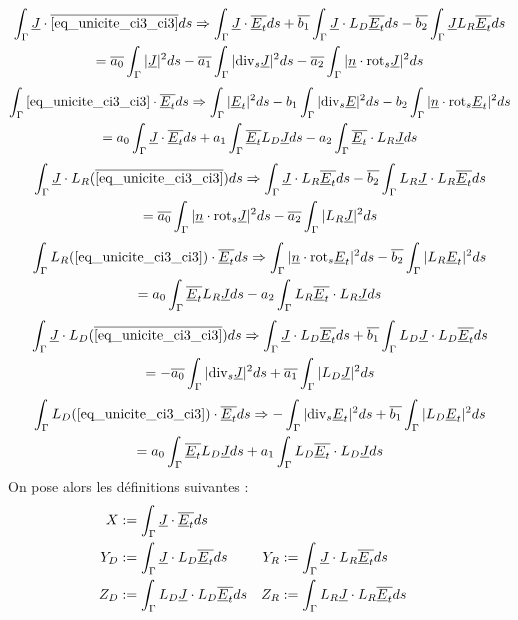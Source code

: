 \begin{multline}
\label{eq:unicite:ci3:csu3-1}
\int_\Gamma \underline{J}\cdot{\overline{\eqref{eq_unicite_ci3_ci3}}}ds \Rightarrow
\int_\Gamma \underline{J} \cdot {\overline{\underline{E}_t}} ds  + {\overline{b_1}} \int_\Gamma \underline{J}\cdot L_D{\overline{\underline{E}_t}} ds - {\overline{b_2}} \int_\Gamma \underline{J} L_R{\overline{\underline{E}_t}} ds \\
= {\overline{a_0}} \int_\Gamma |\underline{J}|^2ds - {\overline{a_1}} \int_\Gamma |{\operatorname{div}_s} \underline{J}|^2 ds - {\overline{a_2}} \int_\Gamma |\underline{n} \cdot {{\operatorname{rot}}_s} \underline{J}|^2 ds
\end{multline}
\begin{multline}
\label{eq:unicite:ci3:csu3-2}
\int_\Gamma \eqref{eq_unicite_ci3_ci3} \cdot {\overline{\underline{E}_t}} ds \Rightarrow
\int_\Gamma |\underline{E}_t|^2 ds  - b_1 \int_\Gamma | {\operatorname{div}_s} \underline{E} |^2 ds - b_2 \int_\Gamma | \underline{n} \cdot {{\operatorname{rot}}_s} \underline{E}_t|^2 ds \\
= a_0 \int_\Gamma \underline{J}\cdot {\overline{\underline{E}_t}}ds + a_1 \int_\Gamma {\overline{\underline{E}_t}} L_D \underline{J} ds - a_2 \int_\Gamma {\overline{\underline{E}_t}} \cdot L_R \underline{J} ds
\end{multline}
\begin{multline}
\label{eq:unicite:ci3:csu3-3}
\int_\Gamma \underline{J} \cdot L_R ( {\overline{\eqref{eq_unicite_ci3_ci3}}} ) ds \Rightarrow
\int_\Gamma \underline{J} \cdot L_R {\overline{\underline{E}_t}} ds  - {\overline{b_2}} \int_\Gamma L_R \underline{J} \cdot L_R {\overline{\underline{E}_t}} ds \\
=  {\overline{a_0}} \int_\Gamma |\underline{n} \cdot {{\operatorname{rot}}_s} \underline{J}|^2ds - {\overline{a_2}} \int_\Gamma | L_R \underline{J}|^2 ds
\end{multline}
\begin{multline}
\label{eq:unicite:ci3:csu3-4}
\int_\Gamma  L_R ( \eqref{eq_unicite_ci3_ci3} ) \cdot {\overline{\underline{E}_t}} ds \Rightarrow
\int_\Gamma | \underline{n} \cdot {{\operatorname{rot}}_s} \underline{E}_t |^2 ds  - {\overline{b_2}} \int_\Gamma | L_R \underline{E}_t|^2 ds \\
= a_0 \int_\Gamma {\overline{\underline{E}_t}} L_R \underline{J} ds - a_2 \int_\Gamma L_R {\overline{\underline{E}_t}} \cdot L_R \underline{J} ds
\end{multline}
\begin{multline}
\label{eq:unicite:ci3:csu3-5}
\int_\Gamma \underline{J} \cdot L_D ( {\overline{\eqref{eq_unicite_ci3_ci3}}} ) ds \Rightarrow
\int_\Gamma \underline{J} \cdot L_D {\overline{\underline{E}_t}} ds  + {\overline{b_1}} \int_\Gamma L_D \underline{J} \cdot L_D {\overline{\underline{E}_t}} ds \\
= - {\overline{a_0}} \int_\Gamma |{\operatorname{div}_s} \underline{J}|^2ds + {\overline{a_1}} \int_\Gamma | L_D \underline{J}|^2 ds
\end{multline}
\begin{multline}
\label{eq:unicite:ci3:csu3-6}
\int_\Gamma  L_D ( \eqref{eq_unicite_ci3_ci3} ) \cdot {\overline{\underline{E}_t}} ds \Rightarrow
-\int_\Gamma | {\operatorname{div}_s} \underline{E}_t |^2 ds  + {\overline{b_1}} \int_\Gamma | L_D \underline{E}_t|^2 ds \\
= a_0 \int_\Gamma {\overline{\underline{E}_t}} L_D \underline{J} ds + a_1 \int_\Gamma L_D {\overline{\underline{E}_t}} \cdot L_D \underline{J} ds
\end{multline}
On pose alors les définitions suivantes :
\begin{align*}
X&:= \int_\Gamma \underline{J} \cdot {\overline{\underline{E}_t}} ds\\
Y_D&:= \int_\Gamma \underline{J} \cdot L_D {\overline{\underline{E}_t}} ds
&Y_R&:= \int_\Gamma \underline{J} \cdot L_R {\overline{\underline{E}_t}} ds\\
Z_D&:= \int_\Gamma L_D \underline{J} \cdot L_D {\overline{\underline{E}_t}} ds
&Z_R&:= \int_\Gamma L_R \underline{J} \cdot L_R {\overline{\underline{E}_t}} ds
\end{align*}

